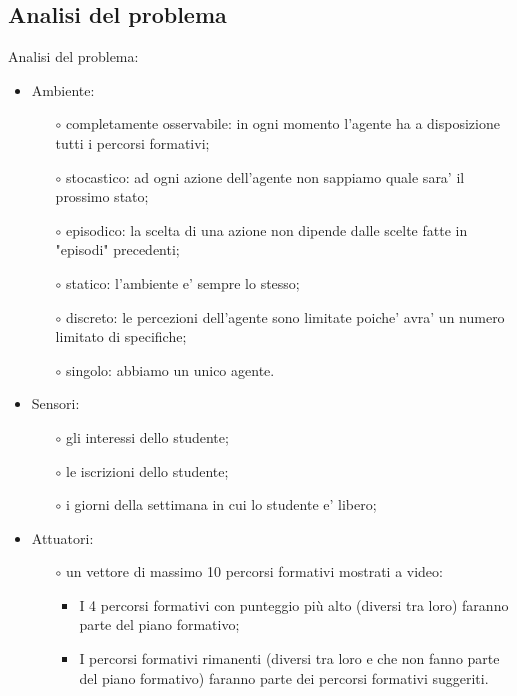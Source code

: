 \documentclass[10pt,a4paper]{article}
\begin{document}
    \subsection{Analisi del problema}
      \label{analisiDelProblemaSubsection}
      Analisi del problema:\\
      \begin{itemize}
        \item Ambiente:
        \begin{itemize}
          \item[$\circ$] completamente osservabile: in ogni momento l'agente ha a disposizione tutti i percorsi formativi;
          \item[$\circ$] stocastico: ad ogni azione dell'agente non sappiamo quale sara' il prossimo stato;
          \item[$\circ$] episodico: la scelta di una azione non dipende dalle scelte fatte in "episodi" precedenti;
          \item[$\circ$] statico: l'ambiente e' sempre lo stesso;
          \item[$\circ$] discreto: le percezioni dell'agente sono limitate poiche' avra' un numero limitato di specifiche;
          \item[$\circ$] singolo: abbiamo un unico agente.
        \end{itemize}
        
        \item Sensori:
        \begin{itemize}
          \item[$\circ$] gli interessi dello studente;
          \item[$\circ$] le iscrizioni dello studente;
          \item[$\circ$] i giorni della settimana in cui lo studente e' libero;
        \end{itemize}
        
        \item Attuatori:
        \begin{itemize}
          \item[$\circ$] un vettore di massimo 10 percorsi formativi mostrati a video:
          \begin{itemize}
            \item I 4 percorsi formativi con punteggio più alto (diversi tra loro) faranno parte del piano formativo;
            \item I percorsi formativi rimanenti (diversi tra loro e che non fanno parte 
            del piano formativo) faranno parte dei percorsi formativi suggeriti. 
          \end{itemize}
        \end{itemize}
      \end{itemize}%
        
\end{document}
